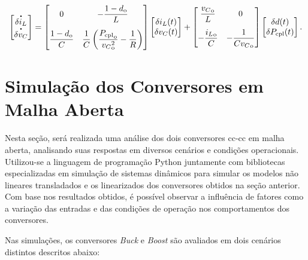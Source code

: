 \begin{equation}
  \begin{bmatrix} 
    \dt{\delta i_L} \\ \dt{\delta v_C} 
  \end{bmatrix} = 
  \begin{bmatrix} 
    \displaystyle 0 & \displaystyle -\frac{1 - d_{\mathrm{o}}}{L}  \\[12pt]\displaystyle \frac{1 - d_{\mathrm{o}}}{C} & \displaystyle \frac{1}{C}\left(\frac{{P_{\mathrm{cpl}}}_{\mathrm{o}}}{{{v_{C}}^2_{\mathrm{o}}}} - \frac{1}{R}\right) 
  \end{bmatrix} 
  \begin{bmatrix} 
    \delta i_L(t) \\ \delta v_C(t) 
  \end{bmatrix} + 
  \begin{bmatrix} 
    \displaystyle \frac{{v_C}_{\mathrm{o}}}{L} & 0 \\[12pt] 
    \displaystyle - \frac{{i_L}_{\mathrm{o}}}{C} & \displaystyle {-\frac{1}{C{v_C}_{\mathrm{o}}}} 
  \end{bmatrix}  
  \begin{bmatrix} 
    \delta d(t) \\ \delta P_{\mathrm{cpl}}(t) 
  \end{bmatrix}. \label{eq:boost_linear_system}
\end{equation}

\section{Simulação dos Conversores em Malha Aberta} \label{section:open_loop}

Nesta seção, será realizada uma análise dos dois conversores \acrshort{cc}-\acrshort{cc} em malha aberta, analisando suas respostas em diversos cenários e condições operacionais. Utilizou-se a linguagem de programação Python juntamente com bibliotecas especializadas em simulação de sistemas dinâmicos para simular os modelos não lineares transladados e os linearizados dos conversores obtidos na seção anterior. Com base nos resultados obtidos, é possível observar a influência de fatores como a variação das entradas e das condições de operação nos comportamentos dos conversores.

Nas simulações, os conversores \textit{Buck} e \textit{Boost} são avaliados em dois cenários distintos descritos abaixo:

